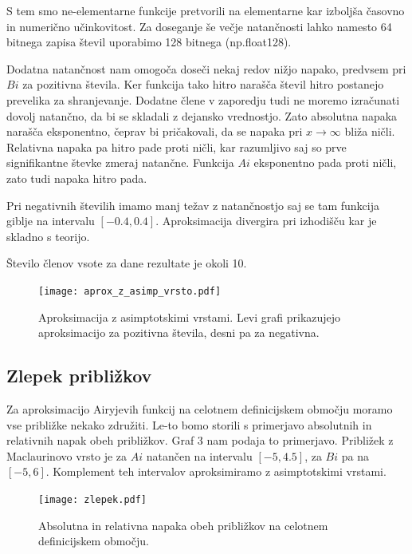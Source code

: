 \documentclass[12pt, a4paper]{article}
\begin{document}
S tem smo ne-elementarne funkcije pretvorili na elementarne kar izboljša časovno in numerično učinkovitost. 
Za doseganje še večje natančnosti lahko namesto 64 bitnega zapisa števil uporabimo 128 bitnega ({\sc np.float128}).

Dodatna natančnost nam omogoča doseči nekaj redov nižjo napako, predvsem pri $Bi$ za pozitivna števila. Ker funkcija tako hitro narašča števil hitro postanejo prevelika za shranjevanje. Dodatne člene v zaporedju tudi ne moremo izračunati dovolj natančno, da bi se skladali z dejansko vrednostjo. Zato absolutna napaka narašča eksponentno, čeprav bi pričakovali, da se napaka pri $x\rightarrow\infty$ bliža ničli. Relativna napaka pa hitro pade proti ničli, kar razumljivo saj so prve signifikantne števke zmeraj natančne. Funkcija $Ai$ eksponentno pada proti ničli, zato tudi napaka hitro pada.

Pri negativnih številih imamo manj težav z natančnostjo saj se tam funkcija giblje na intervalu $[-0.4, 0.4]$. Aproksimacija divergira pri izhodišču kar je skladno s teorijo.

Število členov vsote za dane rezultate je okoli 10.

\begin{figure}[hbtp]
  \begin{center}
  \texttt{[image: aprox\_z\_asimp\_vrsto.pdf]}
  \end{center}
  \vspace*{-7mm}
  \caption{Aproksimacija z asimptotskimi vrstami. Levi grafi prikazujejo aproksimacijo za pozitivna števila, desni pa za negativna.}
\end{figure}

\subsection{Zlepek približkov}

Za aproksimacijo Airyjevih funkcij na celotnem definicijskem območju moramo vse približke nekako združiti. Le-to bomo storili s primerjavo absolutnih in relativnih napak obeh približkov. Graf 3 nam podaja to primerjavo. Približek z Maclaurinovo vrsto je za $Ai$ natančen na intervalu $[-5, 4.5]$, za $Bi$ pa na $[-5, 6]$. Komplement teh intervalov aproksimiramo z asimptotskimi vrstami.

\begin{figure}[hbtp]
  \begin{center}
  \texttt{[image: zlepek.pdf]}
  \end{center}
  \vspace*{-7mm}
  \caption{Absolutna in relativna napaka obeh približkov na celotnem definicijskem območju.}
\end{figure}
\end{document}
